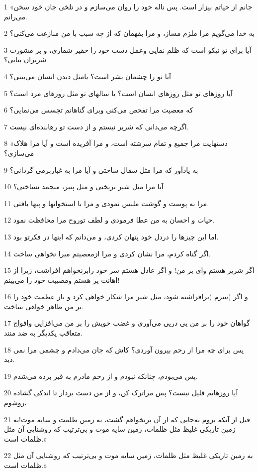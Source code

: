 \par 1 «جانم از حیاتم بیزار است. پس ناله خود را روان می‌سازم و در تلخی جان خود سخن می‌رانم.
\par 2 به خدا می‌گویم مرا ملزم مساز، و مرا بفهمان که از چه سبب با من منازعت می‌کنی؟
\par 3 آیا برای تو نیکو است که ظلم نمایی وعمل دست خود را حقیر شماری، و بر مشورت شریران بتابی؟
\par 4 آیا تو را چشمان بشر است؟ یامثل دیدن انسان می‌بینی؟
\par 5 آیا روزهای تو مثل روزهای انسان است؟ یا سالهای تو مثل روزهای مرد است؟
\par 6 که معصیت مرا تفحص می‌کنی وبرای گناهانم تجسس می‌نمایی؟
\par 7 اگر‌چه می‌دانی که شریر نیستم و از دست تو رهاننده‌ای نیست.
\par 8 «دستهایت مرا جمیع و تمام سرشته است، و مرا آفریده است و آیا مرا هلاک می‌سازی؟
\par 9 به یادآور که مرا مثل سفال ساختی و آیا مرا به غباربرمی گردانی؟
\par 10 آیا مرا مثل شیر نریختی و مثل پنیر، منجمد نساختی؟
\par 11 مرا به پوست و گوشت ملبس نمودی و مرا با استخوانها و پیها بافتی. 
\par 12 حیات و احسان به من عطا فرمودی و لطف توروح مرا محافظت نمود.
\par 13 اما این چیزها را دردل خود پنهان کردی، و می‌دانم که اینها در فکرتو بود.
\par 14 اگر گناه کردم، مرا نشان کردی و مرا ازمعصیتم مبرا نخواهی ساخت.
\par 15 اگر شریر هستم وای بر من! و اگر عادل هستم سر خود رابرنخواهم افراشت، زیرا از اهانت پر هستم ومصیبت خود را می‌بینم!
\par 16 و اگر (سرم )برافراشته شود، مثل شیر مرا شکار خواهی کرد و باز عظمت خود را بر من ظاهر خواهی ساخت.
\par 17 گواهان خود را بر من پی درپی می‌آوری و غضب خویش را بر من می‌افزایی وافواج متعاقب یکدیگر به ضد منند.
\par 18 پس برای چه مرا از رحم بیرون آوردی؟ کاش که جان می‌دادم و چشمی مرا نمی دید.
\par 19 پس می‌بودم، چنانکه نبودم و از رحم مادرم به قبر برده می‌شدم.
\par 20 آیا روزهایم قلیل نیست؟ پس مراترک کن، و از من دست بردار تا اندکی گشاده روشوم،
\par 21 قبل از آنکه بروم به‌جایی که از آن برنخواهم گشت، به زمین ظلمت و سایه موت!به زمین تاریکی غلیظ مثل ظلمات، زمین سایه موت و بی‌ترتیب که روشنایی آن مثل ظلمات است.»
\par 22 به زمین تاریکی غلیظ مثل ظلمات، زمین سایه موت و بی‌ترتیب که روشنایی آن مثل ظلمات است.»
 
